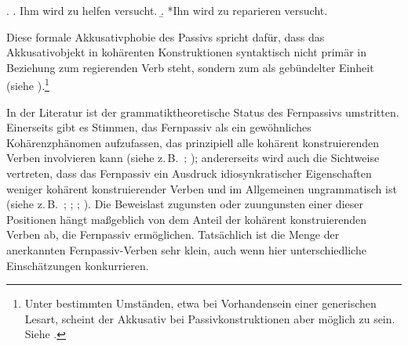 \ex. 
\a. Ihm wird zu helfen versucht. \label{ex-fernpassiv-dativ}
\b. *Ihn wird zu reparieren versucht. \label{ex-fernpassiv-acc}

Diese formale Akkusativphobie des Passivs spricht dafür, dass das Akkusativobjekt in kohärenten Konstruktionen syntaktisch nicht primär in Beziehung zum regierenden Verb steht, sondern zum  als gebündelter Einheit (siehe \citealt[253]{Haider:93}).\footnote{Unter bestimmten Umständen, etwa bei Vorhandensein einer generischen Lesart, scheint der Akkusativ bei Passivkonstruktionen aber möglich zu sein. Siehe \citet[301ff]{Meurers:99}.} %

In der Literatur ist der grammatiktheoretische Status des Fernpassivs umstritten. Einerseits gibt es Stimmen, das Fernpassiv als ein gewöhnliches Kohärenzphänomen aufzufassen, das prinzipiell alle kohärent konstruierenden Verben involvieren kann (siehe z.\,B.\ \citealt{Wurmbrand:01}; \citealt{Sabel:01}); andererseits wird auch die Sichtweise vertreten, dass das Fernpassiv ein Ausdruck idiosynkratischer Eigenschaften weniger kohärent konstruierender Verben und im Allgemeinen ungrammatisch ist (siehe z.\,B.\ \citealt[177f]{Hoehle:78}; \citealt[Abschnitt~3.3.1.4]{Kiss:95}; \citealt{Reis:Sternefeld:04}; \citealt{Grosse:05}). Die Beweislast zugunsten oder zuungunsten einer dieser Positionen hängt ma\ss geblich von dem Anteil der kohärent konstruierenden Verben ab, die Fernpassiv ermöglichen. Tatsächlich ist die Menge der anerkannten Fernpassiv-Verben sehr klein, auch wenn hier unterschiedliche Einschätzungen konkurrieren. 

